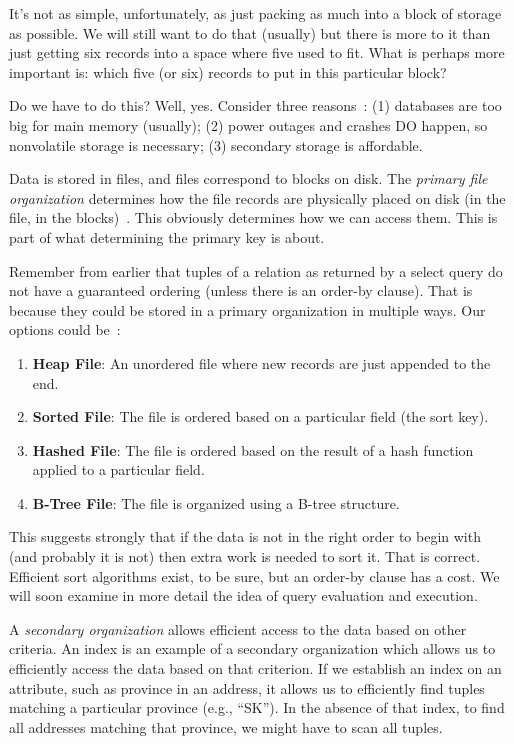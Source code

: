 It's not as simple, unfortunately, as just packing as much into a block of storage as possible. We will still want to do that (usually) but there is more to it than just getting six records into a space where five used to fit. What is perhaps more important is: which five (or six) records to put in this particular block?

Do we have to do this? Well, yes. Consider three reasons~\cite{fds}: (1) databases are too big for main memory (usually); (2) power outages and crashes DO happen, so nonvolatile storage is necessary; (3) secondary storage is affordable.

Data is stored in files, and files correspond to blocks on disk. The \textit{primary file organization} determines how the file records are physically placed on disk (in the file, in the blocks)~\cite{fds}. This obviously determines how we can access them. This is part of what determining the primary key is about. 

Remember from earlier that tuples of a relation as returned by a select query do not have a guaranteed ordering (unless there is an order-by clause). That is because they could be stored in a primary organization in multiple ways. Our options could be~\cite{fds}:

\begin{enumerate}
	\item \textbf{Heap File}: An unordered file where new records are just appended to the end.
	\item \textbf{Sorted File}: The file is ordered based on a particular field (the sort key).
	\item \textbf{Hashed File}: The file is ordered based on the result of a hash function applied to a particular field.
	\item \textbf{B-Tree File}: The file is organized using a B-tree structure.
\end{enumerate}

This suggests strongly that if the data is not in the right order to begin with (and probably it is not) then extra work is needed to sort it. That is correct. Efficient sort algorithms exist, to be sure, but an order-by clause has a cost. We will soon examine in more detail the idea of query evaluation and execution.

A \textit{secondary organization} allows efficient access to the data based on other criteria. An index is an example of a secondary organization which allows us to efficiently access the data based on that criterion. If we establish an index on an attribute, such as province in an address, it allows us to efficiently find tuples matching a particular province (e.g., ``SK''). In the absence of that index, to find all addresses matching that province, we might have to scan all tuples.

